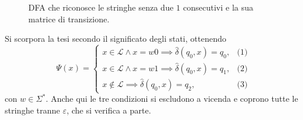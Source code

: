\documentclass[a4paper, 11pt, oneside]{book}
\theoremstyle{formale}
\begin{document}
    \begin{figure}[H]
        \centering
        \caption{DFA che riconosce le stringhe senza due $1$ consecutivi e la sua matrice
            di transizione.}
        \label{fig:es-no-uno}
    \end{figure}

    Si scorpora la tesi secondo il significato degli stati, ottenendo
    \begin{equation*}
        \Psi(x) =
        \begin{cases}
            x \in \mathcal{L} \land x = w0 \implies \hat{\delta}(q_0, x) = q_0,
                & \text{(1)} \\
            x \in \mathcal{L} \land x = w1 \implies \hat{\delta}(q_0, x) = q_1,
                & \text{(2)} \\
            x \notin \mathcal{L} \implies \hat{\delta}(q_0, x) = q_2,
                & \text{(3)}
        \end{cases}
    \end{equation*}
    con $w \in \Sigma^*$. Anche qui le tre condizioni si escludono a vicenda e coprono
    tutte le stringhe tranne $\varepsilon$, che si verifica a parte.
\end{document}
